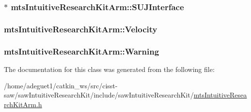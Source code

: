 \hypertarget{classmts_intuitive_research_kit_arm_adc1ca72351965ff611fcf889d20d92c9}{
\subsubsection[{S\-U\-J\-Interface}]{$\ast$ mts\-Intuitive\-Research\-Kit\-Arm\-::\-S\-U\-J\-Interface\hspace{0.3cm}{\ttfamily [protected]}}}\label{classmts_intuitive_research_kit_arm_adc1ca72351965ff611fcf889d20d92c9}
\hypertarget{classmts_intuitive_research_kit_arm_a54046b45c03a94fcacb9a3b335a19c0a}{
\subsubsection[{Velocity}]{ mts\-Intuitive\-Research\-Kit\-Arm\-::\-Velocity}}\label{classmts_intuitive_research_kit_arm_a54046b45c03a94fcacb9a3b335a19c0a}
\hypertarget{classmts_intuitive_research_kit_arm_a1fd3779c8e6c205523e852df2c3e9172}{
\subsubsection[{Warning}]{ mts\-Intuitive\-Research\-Kit\-Arm\-::\-Warning}}\label{classmts_intuitive_research_kit_arm_a1fd3779c8e6c205523e852df2c3e9172}


The documentation for this class was generated from the following file\-:\begin{DoxyCompactItemize}
\item 
/home/adeguet1/catkin\-\_\-ws/src/cisst-\/saw/saw\-Intuitive\-Research\-Kit/include/saw\-Intuitive\-Research\-Kit/\hyperlink{mts_intuitive_research_kit_arm_8h}{mts\-Intuitive\-Research\-Kit\-Arm.\-h}\end{DoxyCompactItemize}
